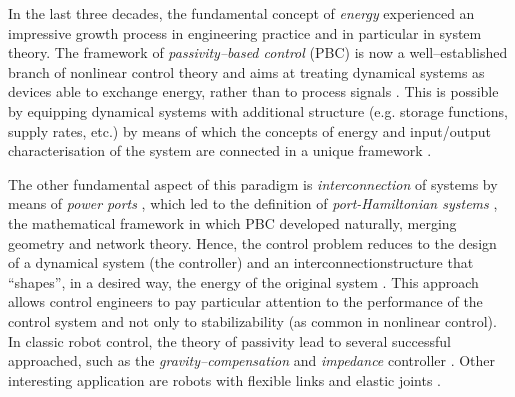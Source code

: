 %
In the last three decades, the fundamental concept of \textit{energy} experienced an impressive growth process in engineering practice and in particular in system theory. 
%
%
%
The framework of \textit{passivity--based control} (PBC) is now a well--established branch of nonlinear control theory and aims at treating dynamical systems as devices able to exchange energy, rather than to process signals \cite{ortega2001putting}. 
This is possible by equipping dynamical systems with additional structure (e.g. storage functions, supply rates, etc.) by means of which the concepts of energy and input/output characterisation of the system are connected in a unique framework \cite{sontag2008input}.
%
\newline

%
The other fundamental aspect of this paradigm is \textit{interconnection} of systems by means of \textit{power ports} \cite{duindam2009modeling}, which led to the definition of \textit{port-Hamiltonian systems} \cite{ortega2001putting,van2014port,MASCHKE1992359}, the mathematical framework in which PBC developed naturally, merging geometry and network theory. Hence, the control problem reduces to the design of a dynamical system (the controller) and an interconnectionstructure that ``shapes'', in a desired way, the energy of the original system \cite{ortega2001putting,ortega2008control}.
%
%
%
This approach allows control engineers to pay particular attention to the performance of the control system and not only to stabilizability (as common in nonlinear control).
%
%
%
In classic robot control, the theory of passivity lead to several successful approached, such as the \textit{gravity--compensation} \cite{arimoto1984stability} and \textit{impedance} controller \cite{secchi2007control}. Other interesting application are robots with flexible links \cite{macchelli2009} and elastic joints \cite{zhang2016}.
%
